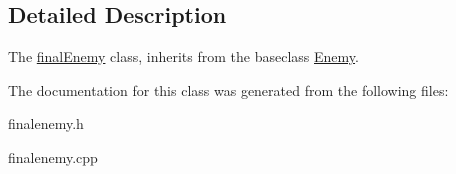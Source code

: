 \subsection{Detailed Description}
The \hyperlink{classfinalEnemy}{final\+Enemy} class, inherits from the baseclass \hyperlink{classEnemy}{Enemy}. 

The documentation for this class was generated from the following files\+:\begin{DoxyCompactItemize}
\item 
finalenemy.\+h\item 
finalenemy.\+cpp\end{DoxyCompactItemize}
